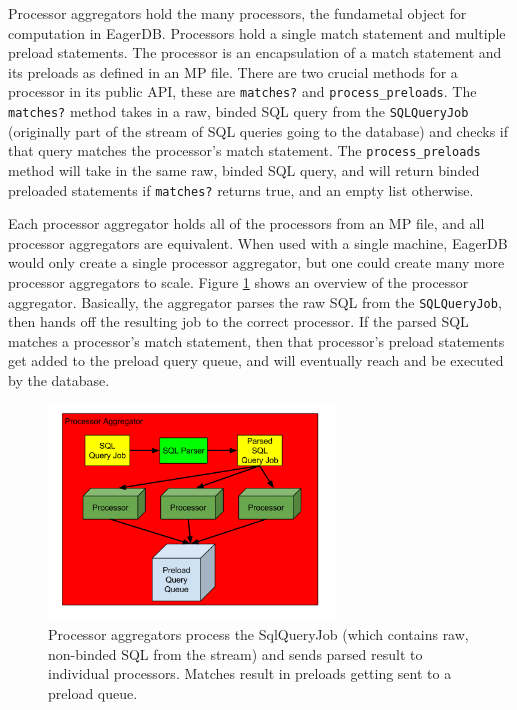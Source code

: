 \documentclass[12pt]{article}
\begin{document}
Processor aggregators hold the many processors, the fundametal object for computation in EagerDB. Processors hold a single match statement and multiple preload statements. The processor is an encapsulation of a match statement and its preloads as defined in an MP file. There are two crucial methods for a processor in its public API, these are \texttt{matches?} and \texttt{process\_preloads}. The \texttt{matches?} method takes in a raw, binded SQL query from the \texttt{SQLQueryJob} (originally part of the stream of SQL queries going to the database) and checks if that query matches the processor's match statement. The \texttt{process\_preloads} method will take in the same raw, binded SQL query, and will return binded preloaded statements if \texttt{matches?} returns true, and an empty list otherwise.

Each processor aggregator holds all of the processors from an MP file, and all processor aggregators are equivalent. When used with a single machine, EagerDB would only create a single processor aggregator, but one could create many more processor aggregators to scale. Figure \ref{fig:processor-aggregator} shows an overview of the processor aggregator. Basically, the aggregator parses the raw SQL from the \texttt{SQLQueryJob}, then hands off the resulting job to the correct processor. If the parsed SQL matches a processor's match statement, then that processor's preload statements get added to the preload query queue, and will eventually reach and be executed by the database.

\begin{figure}[h]
  \centering
  \includegraphics[width=3in]{figures/processor_aggregator.png}
  \caption{\label{fig:processor-aggregator}Processor aggregators process the SqlQueryJob (which contains raw, non-binded SQL from the stream) and sends parsed result to individual processors. Matches result in preloads getting sent to a preload queue.}
\end{figure}
\end{document}

